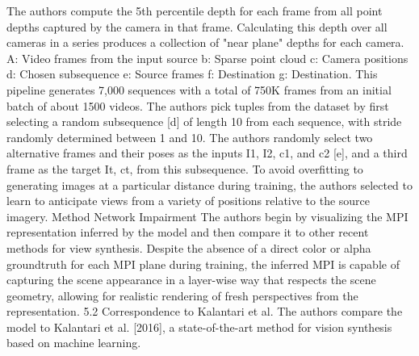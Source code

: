 The authors compute the 5th percentile depth for each frame from all point depths captured by the camera in that frame.
Calculating this depth over all cameras in a series produces a collection of "near plane" depths for each camera.
A: Video frames from the input source b: Sparse point cloud c: Camera positions d: Chosen subsequence e: Source frames f: Destination g: Destination.
This pipeline generates 7,000 sequences with a total of 750K frames from an initial batch of about 1500 videos.
The authors pick tuples from the dataset by first selecting a random subsequence [d] of length 10 from each sequence, with stride randomly determined between 1 and 10.
The authors randomly select two alternative frames and their poses as the inputs I1, I2, c1, and c2 [e], and a third frame as the target It, ct, from this subsequence.
To avoid overfitting to generating images at a particular distance during training, the authors selected to learn to anticipate views from a variety of positions relative to the source imagery.
Method Network Impairment
The authors begin by visualizing the MPI representation inferred by the model and then compare it to other recent methods for view synthesis.
Despite the absence of a direct color or alpha groundtruth for each MPI plane during training, the inferred MPI is capable of capturing the scene appearance in a layer-wise way that respects the scene geometry, allowing for realistic rendering of fresh perspectives from the representation.
5.2 Correspondence to Kalantari et al. The authors compare the model to Kalantari et al. [2016], a state-of-the-art method for vision synthesis based on machine learning.


